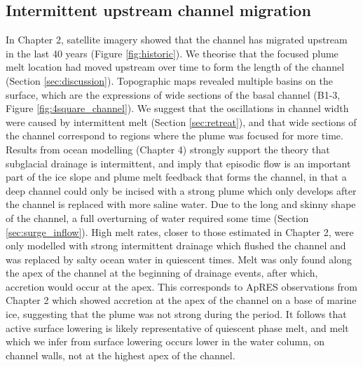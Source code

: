 \subsection{Intermittent upstream channel migration}

In Chapter 2, satellite imagery showed that the channel has migrated upstream in the last 40 years (Figure \ref{fig:historic}).  We theorise that the focused plume melt location had moved upstream over time to form the length of the channel (Section \ref{sec:discussion}). Topographic maps revealed multiple basins on the surface, which are the expressions of wide sections of the basal channel (B1-3, Figure \ref{fig:4square_channel}). We suggest that the oscillations in channel width were  caused by intermittent melt (Section \ref{sec:retreat}), and that wide sections of the channel correspond to regions where the plume was focused for more time.
Results from ocean modelling (Chapter 4) strongly support the theory that subglacial drainage is intermittent, and imply that episodic flow is an important part of the ice slope and plume melt feedback that forms the channel, in that a deep channel could only be incised with a strong plume which only develops after the channel is replaced with more saline water. Due to the long and skinny shape of the channel, a full overturning of water required some time (Section \ref{sec:surge_inflow}).  High melt rates, closer to those estimated in Chapter 2, were only modelled with strong intermittent drainage which flushed the channel and was replaced by salty ocean water in quiescent times. 
Melt was only found along the apex of the channel at the beginning of drainage events, after which, accretion would occur at the apex. This corresponds to ApRES observations from Chapter 2 which showed accretion at the apex of the channel on a base of marine ice, suggesting that the plume was not strong during the period. 
It follows that active surface lowering is likely representative of quiescent phase melt, and melt which we infer from surface lowering occurs lower in the water column, on channel walls, not at the highest apex of the channel.


